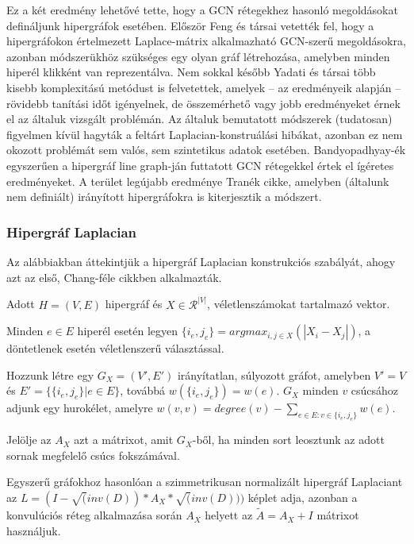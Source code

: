 Ez a két eredmény lehetővé tette, hogy a GCN rétegekhez hasonló megoldásokat defináljunk hipergráfok esetében. Először Feng és társai vetették fel, hogy a hipergráfokon értelmezett Laplace-mátrix alkalmazható GCN-szerű megoldásokra\cite{hgnn}, azonban módszerükhöz szükséges egy olyan gráf létrehozása, amelyben minden hiperél klikként van reprezentálva. Nem sokkal később Yadati és társai több kisebb komplexitású metódust is felvetettek\cite{hgcn}, amelyek -- az eredményeik alapján -- rövidebb tanítási időt igényelnek, de összemérhető vagy jobb eredményeket érnek el az általuk vizsgált problémán. Az általuk bemutatott módszerek (tudatosan) figyelmen kívül hagyták a feltárt Laplacian-konstruálási hibákat, azonban ez nem okozott problémát sem valós, sem szintetikus adatok esetében. Bandyopadhyay-ék egyszerűen a hipergráf line graph-ján futtatott GCN rétegekkel értek el ígéretes eredményeket\cite{line_hgnn}. A terület legújabb eredménye Tranék cikke\cite{directed_hgnn}, amelyben (általunk nem definiált) irányított hipergráfokra is kiterjesztik a módszert.

\subsubsection{Hipergráf Laplacian} \label{hypergraphLaplacian}

Az alábbiakban áttekintjük a hipergráf Laplacian konstrukciós szabályát, ahogy azt az első, Chang-féle cikkben alkalmazták\cite{base_hypergraph_laplacian}.


Adott $H=(V,E)$ hipergráf és $X \in \mathcal{R}^{|V|}$, véletlenszámokat tartalmazó vektor.

\begin{compactenum}
	\item Minden $e \in E$ hiperél esetén legyen $\{i_e, j_e\} = argmax_{i,j \in X}(|X_i - X_j|)$, a döntetlenek esetén véletlenszerű választással.
	\item Hozzunk létre egy $G_X=(V',E')$ irányítatlan, súlyozott gráfot, amelyben $V'=V$ és $E'=\{\{i_e, j_e\} | e \in E\}$, továbbá $w(\{i_e, j_e\})=w(e)$. $G_X$ minden $v$ csúcsához adjunk egy hurokélet, amelyre $w(v,v)=degree(v) - \sum_{e \in E : v \in \{i_e, j_e\}} w(e)$.
	\item Jelölje az $A_X$ azt a mátrixot, amit $G_X$-ből, ha minden sort leosztunk az adott sornak megfelelő csúcs fokszámával.
	\item Egyszerű gráfokhoz hasonlóan a szimmetrikusan normalizált hipergráf Laplaciant az $L = (I-\sqrt(inv(D))*A_X*\sqrt(inv(D)))$ képlet adja, azonban a konvulúciós réteg alkalmazása során $A_X$ helyett az $\tilde A = A_X + I$ mátrixot használjuk.
\end{compactenum}

